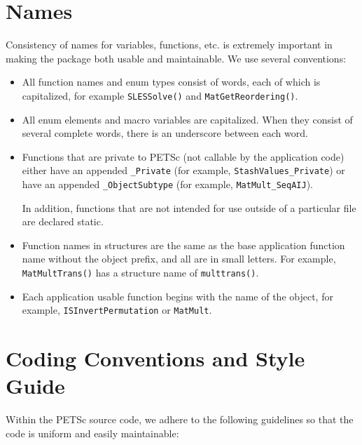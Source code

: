 \section{Names}
Consistency of names for variables, functions, etc. is extremely 
important in making the package both usable and maintainable.
We use several conventions:
\begin{itemize}
\item All function names and enum types consist of words, each of 
      which is capitalized, for example {\tt SLESSolve()} and 
      {\tt MatGetReordering()}.
\item All enum elements and macro variables are capitalized. When
      they consist of several
      complete words, there is an underscore between each word.
\item Functions that are private to PETSc (not callable by the 
      application code) either
        \subitem have an appended {\tt \_Private} (for example, 
           {\tt StashValues\_Private}) or
        \subitem have an appended {\tt \_ObjectSubtype} (for example,
           {\tt MatMult\_SeqAIJ}).

      In addition, functions that are not intended for use outside
      of a particular file are declared static.
\item Function names in structures are the same as the base application
      function name without the object prefix, and all are in small letters. 
      For example, {\tt MatMultTrans()} has a structure name of 
      {\tt multtrans()}.
\item Each application usable function begins with the name of the object, 
      for example, {\tt ISInvertPermutation} or {\tt MatMult}. 
\end{itemize}

\section{Coding Conventions and Style Guide}

Within the PETSc source code, we adhere to the following guidelines
so that the code is uniform and easily maintainable:

